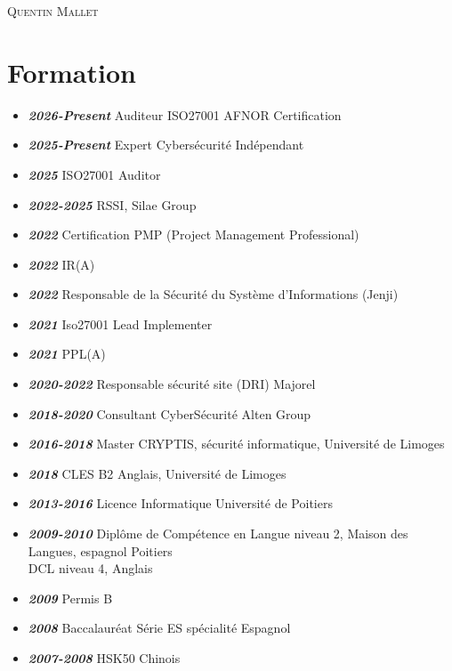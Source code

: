 \documentclass[a4paper, oneside, final]{scrartcl} %
\begin{document}
\begin{center} %


{\fontsize{36}{36}\selectfont\scshape Quentin
Mallet} %

\vspace{1.5cm} %


\section*{Formation}
\begin{itemize}
\item\textit{\textbf{2026-Present}} Auditeur ISO27001 AFNOR Certification
\item\textit{\textbf{2025-Present}} Expert Cybersécurité Indépendant
\item\textit{\textbf{2025}} ISO27001 Auditor
\item\textit{\textbf{2022-2025}} RSSI, Silae Group
\item\textit{\textbf{2022}} Certification PMP (Project Management Professional)
\item\textit{\textbf{2022}} IR(A)
\item\textit{\textbf{2022}} Responsable de la Sécurité du Système d'Informations (Jenji)
\item\textit{\textbf{2021}} Iso27001 Lead Implementer
\item\textit{\textbf{2021}} PPL(A)
\item \textit{\textbf{2020-2022}} Responsable sécurité site (DRI) Majorel
\item \textit{\textbf{2018-2020}} Consultant CyberSécurité Alten Group
\item \textit{\textbf{2016-2018}} Master CRYPTIS, sécurité informatique, Université de Limoges
\item\textit{\textbf{2018}} CLES B2 Anglais, Université de Limoges
\item \textit{\textbf{2013-2016}} Licence Informatique Université de Poitiers
\item \textit{\textbf{2009-2010}}  Diplôme de Compétence en Langue niveau 2, Maison des Langues, espagnol Poitiers\\
DCL niveau 4, Anglais
\item \textit{\textbf{2009}}  Permis B
\item \textit{\textbf{2008} }Baccalauréat Série ES spécialité Espagnol
\item \textit{\textbf{2007-2008}}  HSK50 Chinois
\end{itemize}






\end{center}
\end{document}
